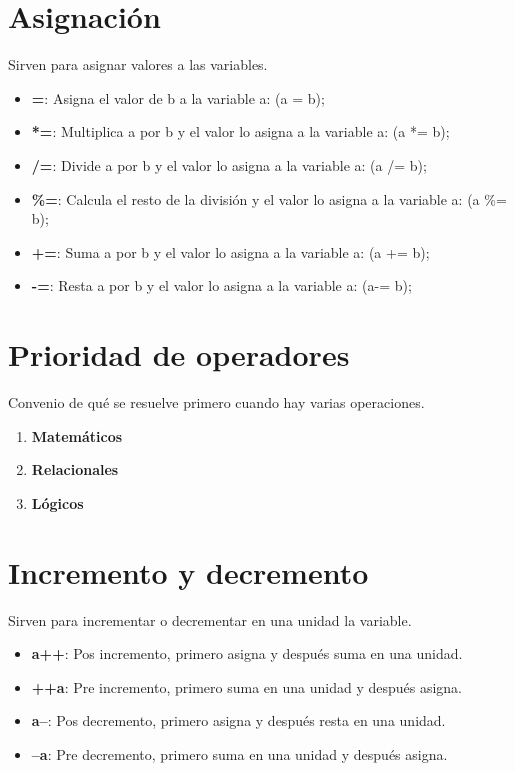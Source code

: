 \section [Asignación]{Asignación}
{Sirven para asignar valores a las variables.}

\vspace{1em}
\begin{itemize}
	\item \textbf{=}: {Asigna el valor de b a la variable a: (a = b);}
	\item \textbf{*=}: {Multiplica a por b y el valor lo asigna a la variable a: (a *= b);}
	\item \textbf{/=}: {Divide a por b y el valor lo asigna a la variable a: (a /= b);}
	\item \textbf{\%=}: {Calcula el resto de la división y el valor lo asigna a la variable a: (a \%= b);}
	\item \textbf{+=}: {Suma a por b y el valor lo asigna a la variable a: (a += b);}
	\item \textbf{-=}: {Resta a por b y el valor lo asigna a la variable a: (a-= b);}
\end{itemize}

\section [Prioridad]{Prioridad de operadores}
Convenio de qué se resuelve primero cuando hay varias operaciones.
\vspace{1em}
\begin{enumerate}
	\item \textbf{Matemáticos}
	\item \textbf{Relacionales}
	\item \textbf{Lógicos}
\end{enumerate}

\section [Incremento y decremento]{Incremento y decremento}
Sirven para incrementar o decrementar en una unidad la variable.
\vspace{1em}
\begin{itemize}
	\item {\textbf{a++}:} Pos incremento, primero asigna y después suma en una unidad.
	\item {\textbf{++a}:} Pre incremento, primero suma en una unidad y después asigna.
	\item {\textbf{a--}:} Pos decremento, primero asigna y después resta en una unidad.
	\item {\textbf{--a}:} Pre decremento, primero suma en una unidad y después asigna.
\end{itemize}